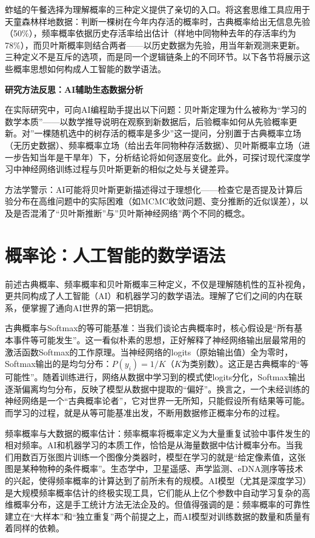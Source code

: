 \documentclass[
  twoside,12pt,fontset=none]{ctexbook}
\renewenvironment{quote}{%
  \def\FrameCommand{{\color{quote-border}\vrule width 4pt}\hspace{10pt}}%
  \MakeFramed {\advance\hsize-\width \FrameRestore\noindent\ignorespaces}%
}{%
  \endMakeFramed
}
\begin{document}
蚱蜢的午餐选择为理解概率的三种定义提供了亲切的入口。将这套思维工具应用于天童森林样地数据：判断一棵树在今年内存活的概率时，古典概率给出无信息先验（50\%），频率概率依据历史存活率给出估计（样地中同物种去年的存活率约为78\%），而贝叶斯概率则结合两者------以历史数据为先验，用当年新观测来更新。三种定义不是互斥的选项，而是同一个逻辑链条上的不同环节。以下各节将展示这些概率思想如何构成人工智能的数学语法。

\begin{quote}
\textbf{研究方法反思：AI辅助生态数据分析}

在实际研究中，可向AI编程助手提出以下问题：贝叶斯定理为什么被称为``学习的数学本质''------以数学推导说明在观察到新数据后，后验概率如何从先验概率更新。对''一棵随机选中的树存活的概率是多少''这一提问，分别置于古典概率立场（无历史数据）、频率概率立场（给出去年同物种存活数据）、贝叶斯概率立场（进一步告知当年是干旱年）下，分析结论将如何逐层变化。此外，可探讨现代深度学习中神经网络训练过程与贝叶斯更新的相似之处与关键差异。

方法学警示：AI可能将贝叶斯更新描述得过于理想化------检查它是否提及计算后验分布在高维问题中的实际困难（如MCMC收敛问题、变分推断的近似误差），以及是否混淆了``贝叶斯推断''与''贝叶斯神经网络''两个不同的概念。
\end{quote}

\hypertarget{probability-ai}{%
\section{概率论：人工智能的数学语法}\label{probability-ai}}

前述古典概率、频率概率和贝叶斯概率三种定义，不仅是理解随机性的互补视角，更共同构成了人工智能（AI）和机器学习的数学语法。理解了它们之间的内在联系，便掌握了通向AI世界的第一把钥匙。

古典概率与Softmax的等可能基准：当我们谈论古典概率时，核心假设是``所有基本事件等可能发生''。这一看似朴素的思想，正好解释了神经网络输出层最常用的激活函数Softmax的工作原理。当神经网络的logits（原始输出值）全为零时，Softmax输出的是均匀分布：\(P(y_i) = 1/K\)（\(K\)为类别数）。这正是古典概率的``等可能性''。随着训练进行，网络从数据中学习到的模式使logits分化，Softmax输出逐渐偏离均匀分布，反映了模型从数据中提取的``偏好''。换言之，一个未经训练的神经网络是一个``古典概率论者''，它对世界一无所知，只能假设所有结果等可能。而学习的过程，就是从等可能基准出发，不断用数据修正概率分布的过程。

频率概率与大数据的概率估计：频率概率将概率定义为大量重复试验中事件发生的相对频率。AI和机器学习的本质工作，恰恰是从海量数据中估计概率分布。当我们用数百万张图片训练一个图像分类器时，模型在学习的就是``给定像素值，这张图是某种物种的条件概率''。生态学中，卫星遥感、声学监测、eDNA测序等技术的兴起，使得频率概率的计算达到了前所未有的规模。AI模型（尤其是深度学习）是大规模频率概率估计的终极实现工具，它们能从上亿个参数中自动学习复杂的高维概率分布，这是手工统计方法无法企及的。但值得强调的是：频率概率的可靠性建立在``大样本''和``独立重复''两个前提之上，而AI模型对训练数据的数量和质量有着同样的依赖。
\end{document}
